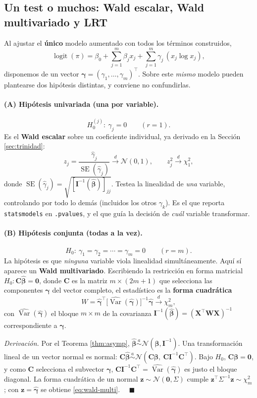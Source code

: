 \documentclass[11pt]{article}
\theoremstyle{plain}
\theoremstyle{definition}
\theoremstyle{remark}
\newcommand{\Var}{\operatorname{Var}}
\newcommand{\logit}{\operatorname{logit}}
\newcommand{\bbeta}{\bm{\beta}}
\newcommand{\bX}{\bm{X}}
\newcommand{\bW}{\bm{W}}
\newcommand{\bI}{\bm{I}}
\newcommand{\hbeta}{\hat{\bm{\beta}}}
\newcommand{\convd}{\xrightarrow{d}}
\newcommand{\Nor}{\mathcal{N}}
\begin{document}
\subsection{Un test o muchos: Wald escalar, Wald multivariado y LRT}
\label{sec:escalar-vs-conjunto}

Al ajustar el \textbf{único} modelo aumentado con todos los términos
construidos,
\[
  \logit(\pi) = \beta_0 + \sum_{j=1}^m \beta_j x_j
  + \sum_{j=1}^m \gamma_j\,(x_j\log x_j),
\]
disponemos de un vector $\bm\gamma=(\gamma_1,\dots,\gamma_m)^\top$. Sobre este
\emph{mismo} modelo pueden plantearse dos hipótesis distintas, y conviene no
confundirlas.

\paragraph{(A) Hipótesis univariada (una por variable).}
\[
  H_0^{(j)}:\ \gamma_j = 0 \qquad (r=1).
\]
Es el \textbf{Wald escalar} sobre un coeficiente individual, ya derivado en la
Sección \ref{sec:trinidad}:
\[
  z_j = \frac{\hat\gamma_j}{\operatorname{SE}(\hat\gamma_j)}\convd\Nor(0,1),
  \qquad z_j^2\convd\chi^2_1,
\]
donde $\operatorname{SE}(\hat\gamma_j)=\sqrt{[\bI^{-1}(\hbeta)]_{jj}}$. Testea la
linealidad de \emph{una} variable, controlando por todo lo demás (incluidos los
otros $\gamma_k$). Es el que reporta \texttt{statsmodels} en
\texttt{.pvalues}, y el que guía la decisión de \emph{cuál} variable
transformar.

\paragraph{(B) Hipótesis conjunta (todas a la vez).}
\[
  H_0:\ \gamma_1=\gamma_2=\cdots=\gamma_m=0 \qquad (r=m).
\]
La hipótesis es que \emph{ninguna} variable viola linealidad simultáneamente.
Aquí sí aparece un \textbf{Wald multivariado}. Escribiendo la restricción en
forma matricial $H_0:\bm C\hbeta = \bm 0$, donde $\bm C$ es la matriz
$m\times(2m+1)$ que selecciona las componentes $\bm\gamma$ del vector completo,
el estadístico es la \textbf{forma cuadrática}
\begin{equation}
  W = \hat{\bm\gamma}^\top
  \big[\widehat{\Var}(\hat{\bm\gamma})\big]^{-1}\hat{\bm\gamma}
  \convd \chi^2_m,
  \label{eq:wald-multi}
\end{equation}
con $\widehat{\Var}(\hat{\bm\gamma})$ el bloque $m\times m$ de la covarianza
$\bI^{-1}(\hbeta)=(\bX^\top\bW\bX)^{-1}$ correspondiente a $\bm\gamma$.

\emph{Derivación.} Por el Teorema \ref{thm:asymp}, $\hbeta\overset{a}{\sim}
\Nor(\bbeta,\bI^{-1})$. Una transformación lineal de un vector normal es normal:
$\bm C\hbeta \overset{a}{\sim}\Nor(\bm C\bbeta,\ \bm C\bI^{-1}\bm C^\top)$. Bajo
$H_0$, $\bm C\bbeta=\bm 0$, y como $\bm C$ selecciona el subvector $\bm\gamma$,
$\bm C\bI^{-1}\bm C^\top = \widehat{\Var}(\hat{\bm\gamma})$ es justo el bloque
diagonal. La forma cuadrática de un normal $\bm z\sim\Nor(\bm0,\Sigma)$ cumple
$\bm z^\top\Sigma^{-1}\bm z\sim\chi^2_m$; con $\bm z=\hat{\bm\gamma}$ se obtiene
\eqref{eq:wald-multi}. $\quad\blacksquare$
\end{document}
